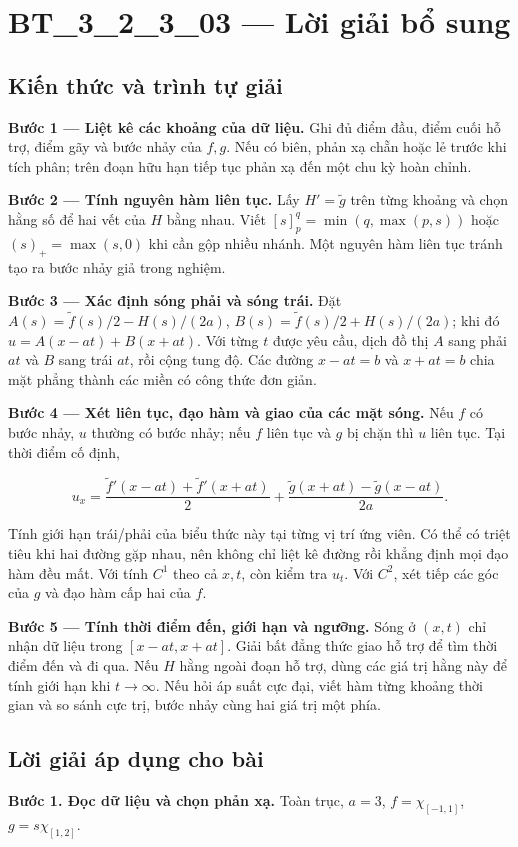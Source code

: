 \documentclass[10pt,a4paper]{article}
\begin{document}
\section*{BT\_3\_2\_3\_03 — Lời giải bổ sung}
\subsection*{Kiến thức và trình tự giải}
\textbf{Bước 1 — Liệt kê các khoảng của dữ liệu.} Ghi đủ điểm đầu, điểm cuối hỗ trợ, điểm gãy và bước nhảy của $f,g$. Nếu có biên, phản xạ chẵn hoặc lẻ trước khi tích phân; trên đoạn hữu hạn tiếp tục phản xạ đến một chu kỳ hoàn chỉnh.

\textbf{Bước 2 — Tính nguyên hàm liên tục.} Lấy $H'=\widetilde g$ trên từng khoảng và chọn hằng số để hai vết của $H$ bằng nhau. Viết $[s]_p^q=\min(q,\max(p,s))$ hoặc $(s)_+=\max(s,0)$ khi cần gộp nhiều nhánh. Một nguyên hàm liên tục tránh tạo ra bước nhảy giả trong nghiệm.

\textbf{Bước 3 — Xác định sóng phải và sóng trái.} Đặt $A(s)=\widetilde f(s)/2-H(s)/(2a)$, $B(s)=\widetilde f(s)/2+H(s)/(2a)$; khi đó $u=A(x-at)+B(x+at)$. Với từng $t$ được yêu cầu, dịch đồ thị $A$ sang phải $at$ và $B$ sang trái $at$, rồi cộng tung độ. Các đường $x-at=b$ và $x+at=b$ chia mặt phẳng thành các miền có công thức đơn giản.

\textbf{Bước 4 — Xét liên tục, đạo hàm và giao của các mặt sóng.} Nếu $f$ có bước nhảy, $u$ thường có bước nhảy; nếu $f$ liên tục và $g$ bị chặn thì $u$ liên tục. Tại thời điểm cố định,


\[
u_x=\frac{\widetilde f'(x-at)+\widetilde f'(x+at)}2+\frac{\widetilde g(x+at)-\widetilde g(x-at)}{2a}.
\]


Tính giới hạn trái/phải của biểu thức này tại từng vị trí ứng viên. Có thể có triệt tiêu khi hai đường gặp nhau, nên không chỉ liệt kê đường rồi khẳng định mọi đạo hàm đều mất. Với tính $C^1$ theo cả $x,t$, còn kiểm tra $u_t$. Với $C^2$, xét tiếp các góc của $g$ và đạo hàm cấp hai của $f$.

\textbf{Bước 5 — Tính thời điểm đến, giới hạn và ngưỡng.} Sóng ở $(x,t)$ chỉ nhận dữ liệu trong $[x-at,x+at]$. Giải bất đẳng thức giao hỗ trợ để tìm thời điểm đến và đi qua. Nếu $H$ hằng ngoài đoạn hỗ trợ, dùng các giá trị hằng này để tính giới hạn khi $t\to\infty$. Nếu hỏi áp suất cực đại, viết hàm từng khoảng thời gian và so sánh cực trị, bước nhảy cùng hai giá trị một phía.
\subsection*{Lời giải áp dụng cho bài}
\textbf{Bước 1. Đọc dữ liệu và chọn phản xạ.} Toàn trục, $a=3$, $f=\chi_{[-1,1]}$, $g=s\chi_{[1,2]}$.
\end{document}

